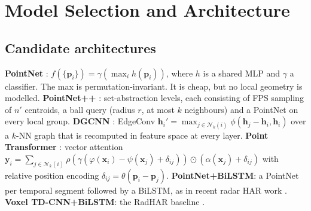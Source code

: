 \chapter{Model Selection and Architecture}
\label{ch:model}

\section{Candidate architectures}
\textbf{PointNet} \cite{qi2017pointnet}: $f(\{\mathbf{p}_i\})=\gamma(\max_i h(\mathbf{p}_i))$,
where $h$ is a shared MLP and $\gamma$ a classifier. The max is permutation-invariant.
It is cheap, but no local geometry is modelled.
\textbf{PointNet++} \cite{qi2017pointnet2}: set-abstraction levels, each consisting
of FPS sampling of $n'$ centroids, a ball query (radius $r$, at most $k$
neighbours) and a PointNet on every local group.
\textbf{DGCNN} \cite{wang2019dgcnn}: EdgeConv
$\mathbf{h}_i'=\max_{j\in\mathcal{N}_k(i)}\phi(\mathbf{h}_j-\mathbf{h}_i,\mathbf{h}_i)$
over a $k$-NN graph that is recomputed in feature space at every layer.
\textbf{Point Transformer} \cite{zhao2021pt}: vector attention
$\mathbf{y}_i=\sum_{j\in\mathcal{N}_k(i)}\rho(\gamma(\varphi(\mathbf{x}_i)-\psi(\mathbf{x}_j)+\delta_{ij}))\odot(\alpha(\mathbf{x}_j)+\delta_{ij})$
with relative position encoding $\delta_{ij}=\theta(\mathbf{p}_i-\mathbf{p}_j)$.
\textbf{PointNet+BiLSTM}: a PointNet per temporal segment followed by a BiLSTM, as
in recent radar HAR work \cite{gu2024lpn}.
\textbf{Voxel TD-CNN+BiLSTM}: the RadHAR baseline \cite{singh2019radhar}.

